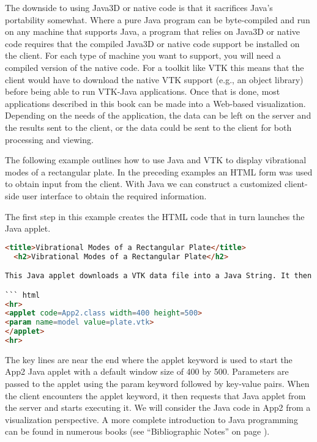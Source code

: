 The downside to using Java3D or native code is that it sacrifices Java's portability somewhat. Where a pure Java program can be byte-compiled and run on any machine that supports Java, a program that relies on Java3D or native code requires that the compiled Java3D or native code support be installed on the client. For each type of machine you want to support, you will need a compiled version of the native code. For a toolkit like VTK this means that the client would have to download the native VTK support (e.g., an object library) before being able to run VTK-Java applications. Once that is done, most applications described in this book can be made into a Web-based visualization. Depending on the needs of the application, the data can be left on the server and the results sent to the client, or the data could be sent to the client for both processing and viewing.

The following example outlines how to use Java and VTK to display vibrational modes of a rectangular plate. In the preceding examples an HTML form was used to obtain input from the client. With Java we can construct a customized client-side user interface to obtain the required information.

The first step in this example creates the HTML code that in turn launches the Java applet.

\begin{lstlisting}[language=HTML, caption={}, numbers=none, frame=none]
<title>Vibrational Modes of a Rectangular Plate</title>
  <h2>Vibrational Modes of a Rectangular Plate</h2>

This Java applet downloads a VTK data file into a Java String. It then uses the InputString method of the VTK data reader to use this string as its data. Then it creates a filter pipeline that takes the original geometry and warps it according to the vector data. There are four sets of vector data in this example. They correspond to the first, second, fourth and eighth vibrational modes. The geometry is color based on the amount of displacement.

``` html
<hr>
<applet code=App2.class width=400 height=500>
<param name=model value=plate.vtk>
</applet>
<hr>
\end{lstlisting}

The key lines are near the end where the applet keyword is used to start the App2 Java applet with a default window size of 400 by 500. Parameters are passed to the applet using the param keyword followed by key-value pairs. When the client encounters the applet keyword, it then requests that Java applet from the server and starts executing it. We will consider the Java code in App2 from a visualization perspective. A more complete introduction to Java programming can be found in numerous books (see ``Bibliographic Notes'' on page \pageref{sec:ch11.bibliographic_notes}).

